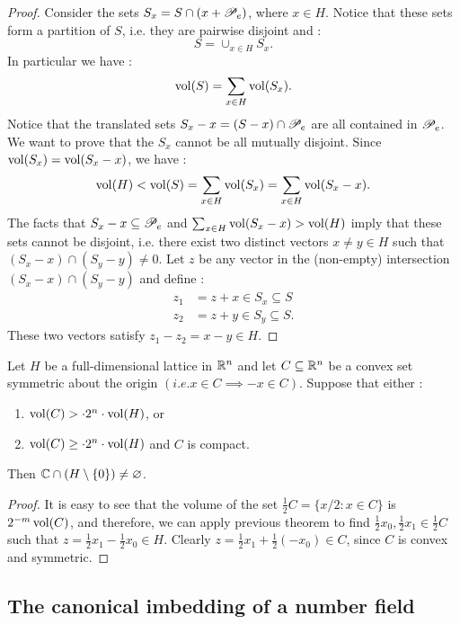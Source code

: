 \begin{proof}
  Consider the sets $S_x = S\cap (x+\mathscr{P}_e)$, where $x\in H$. Notice that these sets form a partition of $S$, i.e. they are pairwise disjoint and :
  \[S = \cup_{x\in H} S_x.\]
  In particular we have :
  \[\operatorname{vol}(S) = \sum_{x\in H}\operatorname{vol}(S_x).\]
  Notice that the translated sets $S_x - x = (S-x)\cap \mathscr{P}_e$ are all contained in $\mathscr{P}_e$. We want to prove that the $S_x$ cannot be all mutually disjoint. Since $\operatorname{vol}(S_x) = \operatorname{vol}(S_x - x)$, we have :
  \[\operatorname{vol}(H)<\operatorname{vol}(S) = \sum_{x\in H}\operatorname{vol}(S_x) = \sum_{x\in H} \operatorname{vol}(S_x - x).\]
  The facts that $S_x - x \subseteq \mathscr{P}_e$ and $\sum_{x\in H}\operatorname{vol}(S_x-x)> \operatorname{vol}(H)$ imply that these sets cannot be disjoint, i.e. there exist two distinct vectors $x\neq y \in H$ such that $(S_x - x)\cap (S_y - y)\neq 0$. Let $z$ be any vector in the (non-empty) intersection $(S_x-x)\cap (S_y - y)$ and define :
  \begin{align*}
    z_1 &= z + x \in S_x \subseteq S \\
    z_2 &= z + y \in S_y \subseteq S.
  \end{align*}
  These two vectors satisfy $z_1 - z_2 = x-y \in H$.
\end{proof}

\begin{theorem}
  Let $H$ be a full-dimensional lattice in $\mathbb{R}^n$ and let $C\subseteq \mathbb{R}^n$ be a convex set symmetric about the origin $(i.e. x\in C \implies -x\in C)$. Suppose that either :
  \begin{enumerate}
    \item $\operatorname{vol}(C) > \cdot 2^n \cdot \operatorname{vol}(H)$, or
    \item $\operatorname{vol}(C) \geq \cdot 2^n \cdot \operatorname{vol}(H)$ and $C$ is compact.
  \end{enumerate}
  Then $ \mathbb{C}\cap (H\setminus\{0\})\neq \varnothing$.
\end{theorem}
\begin{proof}
  It is easy to see that the volume of the set $\frac12 C = \{x/2 : x\in C\}$ is $2^{-m}\operatorname{vol}(C)$, and therefore, we can apply previous theorem to find $\frac12 x_0,\frac12 x_1\in \frac12 C$ such that $z = \frac12 x_1 - \frac12 x_0 \in H$. Clearly $z = \frac12 x_1 + \frac12 (-x_0) \in C$, since $C$ is convex and symmetric.
\end{proof}


\subsection{The canonical imbedding of a number field}

